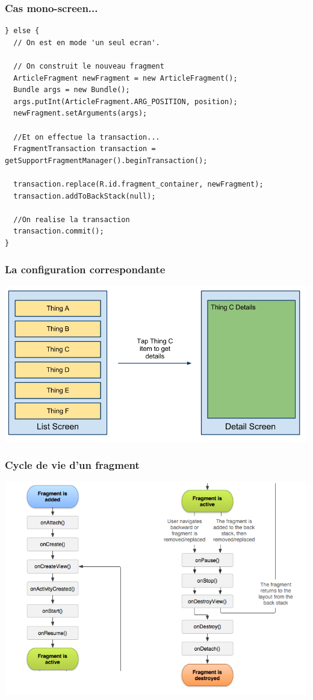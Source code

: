 \documentclass{beamer}
\begin{document}
\begin{frame}[fragile]
\frametitle{Cas mono-screen...}
\begin{lstlisting}
} else {
  // On est en mode 'un seul ecran'.

  // On construit le nouveau fragment
  ArticleFragment newFragment = new ArticleFragment();
  Bundle args = new Bundle();
  args.putInt(ArticleFragment.ARG_POSITION, position);
  newFragment.setArguments(args);

  //Et on effectue la transaction...
  FragmentTransaction transaction = getSupportFragmentManager().beginTransaction();

  transaction.replace(R.id.fragment_container, newFragment);
  transaction.addToBackStack(null);

  //On realise la transaction
  transaction.commit();
}
\end{lstlisting}
\end{frame}


\begin{frame}
\frametitle{La configuration correspondante}
\begin{center}
\includegraphics[scale=0.3]{fragments_mono.png}
\end{center}
\end{frame}

\begin{frame}
\frametitle{Cycle de vie d'un fragment}
\begin{center}
\includegraphics[scale=0.4]{fragment_lifecycle.png}
\end{center}
\end{frame}
\end{document}
